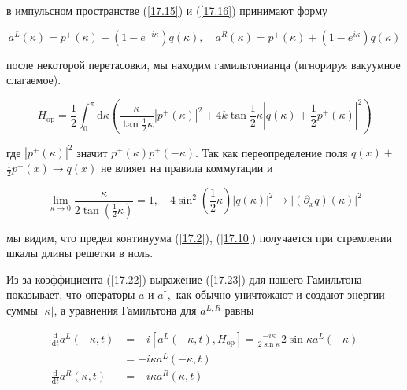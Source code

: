 \documentclass[main.tex]{subfiles}
\begin{document}
в импульсном пространстве (\ref{17.15}) и (\ref{17.16}) принимают форму

\begin{equation}\label{17.24}
    a^{L}(\kappa)=p^{+}(\kappa)+\left(1-e^{-i \kappa}\right) q(\kappa), \quad a^{R}(\kappa)=p^{+}(\kappa)+\left(1-e^{i \kappa}\right) q(\kappa)
\end{equation}

после некоторой перетасовки, мы находим гамильтонианца (игнорируя вакуумное слагаемое).

\begin{equation}\label{17.25}
H_{\mathrm{op}}=\frac{1}{2} \int_{0}^{\pi} \mathrm{d} \kappa\left(\frac{\kappa}{\tan \frac{1}{2} \kappa}\left|p^{+}(\kappa)\right|^{2}+4 k \tan \frac{1}{2} \kappa\left|q(\kappa)+\frac{1}{2} p^{+}(\kappa)\right|^{2}\right)
\end{equation}

где $\left|p^{+}(\kappa)\right|^{2}$ значит $p^{+}(\kappa) p^{+}(-\kappa)$. Так как переопределение поля $q(x)+$ $\frac{1}{2} p^{+}(x) \rightarrow q(x)$ не влияет на правила коммутации и

\begin{equation}\label{17.26}
\lim _{\kappa \rightarrow 0} \frac{\kappa}{2 \tan \left(\frac{1}{2} \kappa\right)}=1, \quad 4 \sin ^{2}\left(\frac{1}{2} \kappa\right)|q(\kappa)|^{2} \rightarrow\left|\left(\partial_{x} q\right)(\kappa)\right|^{2}
\end{equation}

мы видим, что предел континуума (\ref{17.2}), (\ref{17.10}) получается при стремлении шкалы длины решетки в ноль.

Из-за коэффициента (\ref{17.22}) выражение (\ref{17.23}) для нашего Гамильтона показывает, что операторы $a$ и $a^{\dagger},$ как обычно уничтожают и создают энергии суммы $|\kappa|$, а уравнения Гамильтона для $a^{L, R}$ равны

\begin{equation}\label{17.27}
	\begin{aligned} \frac{\mathrm{d}}{\mathrm{d} t} a^{L}(-\kappa, t) &=-i\left[a^{L}(-\kappa, t), H_{\mathrm{op}}\right]=\frac{-i \kappa}{2 \sin \kappa} 2 \sin \kappa a^{L}(-\kappa) \\ &=-i \kappa a^{L}(-\kappa, t) \\ \frac{\mathrm{d}}{\mathrm{d} t} a^{R}(\kappa, t) &=-i \kappa a^{R}(\kappa, t) \end{aligned}
\end{equation}
\end{document}
